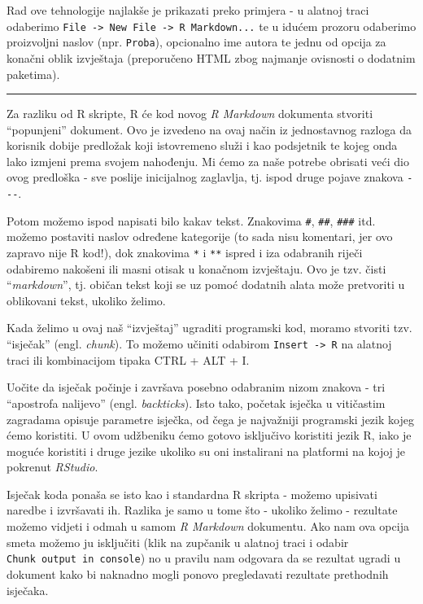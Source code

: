 \documentclass[]{book}
\theoremstyle{definition}
\theoremstyle{definition}
\theoremstyle{definition}
\theoremstyle{remark}
\begin{document}
Rad ove tehnologije najlakše je prikazati preko primjera - u alatnoj
traci odaberimo
\texttt{File\ -\textgreater{}\ New\ File\ -\textgreater{}\ R\ Markdown...}
te u idućem prozoru odaberimo proizvoljni naslov (npr. \texttt{Proba}),
opcionalno ime autora te jednu od opcija za konačni oblik izvještaja
(preporučeno HTML zbog najmanje ovisnosti o dodatnim paketima).

\begin{center}\rule{0.5\linewidth}{\linethickness}\end{center}

Za razliku od R skripte, R će kod novog \emph{R Markdown} dokumenta
stvoriti ``popunjeni'' dokument. Ovo je izvedeno na ovaj način iz
jednostavnog razloga da korisnik dobije predložak koji istovremeno služi
i kao podsjetnik te kojeg onda lako izmjeni prema svojem nahođenju. Mi
ćemo za naše potrebe obrisati veći dio ovog predloška - sve poslije
inicijalnog zaglavlja, tj. ispod druge pojave znakova \texttt{-\/-\/-}.

Potom možemo ispod napisati bilo kakav tekst. Znakovima \texttt{\#},
\texttt{\#\#}, \texttt{\#\#\#} itd. možemo postaviti naslov određene
kategorije (to sada nisu komentari, jer ovo zapravo nije R kod!), dok
znakovima \texttt{*} i \texttt{**} ispred i iza odabranih riječi
odabiremo nakošeni ili masni otisak u konačnom izvještaju. Ovo je tzv.
čisti ``\emph{markdown}'', tj. običan tekst koji se uz pomoć dodatnih
alata može pretvoriti u oblikovani tekst, ukoliko želimo.

Kada želimo u ovaj naš ``izvještaj'' ugraditi programski kod, moramo
stvoriti tzv. ``isječak'' (engl. \emph{chunk}). To možemo učiniti
odabirom \texttt{Insert\ -\textgreater{}\ R} na alatnoj traci ili
kombinacijom tipaka CTRL + ALT + I.

Uočite da isječak počinje i završava posebno odabranim nizom znakova -
tri ``apostrofa nalijevo'' (engl. \emph{backticks}). Isto tako, početak
isječka u vitičastim zagradama opisuje parametre isječka, od čega je
najvažniji programski jezik kojeg ćemo koristiti. U ovom udžbeniku ćemo
gotovo isključivo koristiti jezik R, iako je moguće koristiti i druge
jezike ukoliko su oni instalirani na platformi na kojoj je pokrenut
\emph{RStudio}.

Isječak koda ponaša se isto kao i standardna R skripta - možemo
upisivati naredbe i izvršavati ih. Razlika je samo u tome što - ukoliko
želimo - rezultate možemo vidjeti i odmah u samom \emph{R Markdown}
dokumentu. Ako nam ova opcija smeta možemo ju isključiti (klik na
zupčanik u alatnoj traci i odabir \texttt{Chunk\ output\ in\ console})
no u pravilu nam odgovara da se rezultat ugradi u dokument kako bi
naknadno mogli ponovo pregledavati rezultate prethodnih isječaka.
\end{document}
